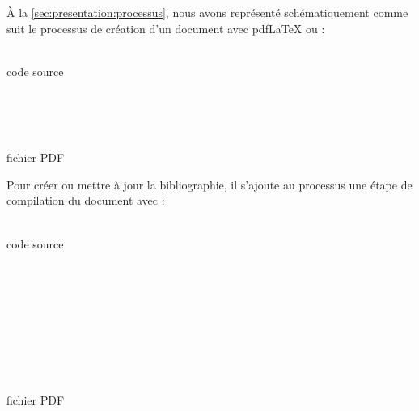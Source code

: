 À la \autoref{sec:presentation:processus}, nous avons représenté
schématiquement comme suit le processus de création d'un document avec
pdf{\LaTeX} ou {\XeLaTeX}:
\begin{center}
  \sffamily
  \begin{minipage}[t]{0.12\linewidth}
    \centering
    {\LARGE\faFileTextO} \\ \medskip
    code source
  \end{minipage}
  \quad\faArrowRight\quad
  \begin{minipage}[t]{0.12\linewidth}
    \centering
    {\LARGE\faCogs} \\ \medskip
     \\ 
  \end{minipage}
  \quad\faArrowRight\quad
  \begin{minipage}[t]{0.12\linewidth}
    \centering
    {\LARGE\faFilePdfO} \\ \medskip
    fichier PDF
  \end{minipage}
\end{center}

Pour créer ou mettre à jour la bibliographie, il s'ajoute au processus
une étape de compilation du document avec {\BibTeX}:
\begin{center}
  \sffamily
  \begin{minipage}[t]{0.12\linewidth}
    \centering
    {\LARGE\faFileTextO} \\ \medskip
    code source
  \end{minipage}
  \quad\faArrowRight\quad
  \begin{minipage}[t]{0.12\linewidth}
    \centering
    {\LARGE\faCogs} \\ \medskip
     \\ 
  \end{minipage}
  \quad\faArrowRight\quad
  \begin{minipage}[t]{0.12\linewidth}
    \centering
    {\LARGE\faCogs} \\ \medskip
  \end{minipage}
  \quad\faArrowRight\quad
  \begin{minipage}[t]{0.12\linewidth}
    \centering
    {\LARGE\faCogs}\;
     \\ \medskip
     \\ 
  \end{minipage}
  \quad\faArrowRight\quad
  \begin{minipage}[t]{0.12\linewidth}
    \centering
    {\LARGE\faFilePdfO} \\ \medskip
    fichier PDF
  \end{minipage}
\end{center}

